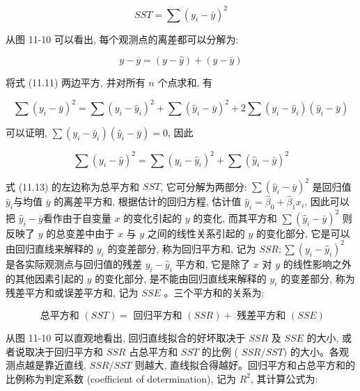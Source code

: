 \documentclass[10pt]{article}
\begin{document}
\begin{CJK*}{UTF8}{bsmi}
\begin{equation*}
S S T=\sum\left(y_{i}-\bar{y}\right)^{2} \tag{11.10}
\end{equation*}


从图 11-10 可以看出, 每个观测点的离差都可以分解为:


\begin{equation*}
y-\bar{y}=(y-\hat{y})+(\hat{y}-\bar{y}) \tag{11.11}
\end{equation*}


将式 (11.11) 两边平方, 并对所有 $n$ 个点求和, 有


\begin{equation*}
\sum\left(y_{i}-\bar{y}\right)^{2}=\sum\left(y_{i}-\hat{y}_{i}\right)^{2}+\sum\left(\hat{y}_{i}-\bar{y}\right)^{2}+2 \sum\left(y_{i}-\hat{y}_{i}\right)\left(\hat{y}_{i}-\bar{y}\right) \tag{11.12}
\end{equation*}


可以证明, $\sum\left(y_{i}-\hat{y}_{i}\right)\left(\hat{y}_{i}-\bar{y}\right)=0$, 因此


\begin{equation*}
\sum\left(y_{i}-\bar{y}\right)^{2}=\sum\left(y_{i}-\hat{y}_{i}\right)^{2}+\sum\left(\hat{y}_{i}-\bar{y}\right)^{2} \tag{11.13}
\end{equation*}


式 (11.13) 的左边称为总平方和 $S S T$, 它可分解为两部分: $\sum\left(\hat{y}_{i}-\bar{y}\right)^{2}$ 是回归值 $\hat{y}_{i}$与均值 $\bar{y}$ 的离差平方和, 根据估计的回归方程, 估计值 $\hat{y}_{i}=\hat{\beta}_{0}+\hat{\beta}_{1} x_{i}$, 因此可以把 $\hat{y}_{i}-\bar{y}$看作由于自变量 $x$ 的变化引起的 $y$ 的变化, 而其平方和 $\sum\left(\hat{y}_{i}-\bar{y}\right)^{2}$ 则反映了 $y$ 的总变差中由于 $x$ 与 $y$ 之间的线性关系引起的 $y$ 的变化部分, 它是可以由回归直线来解释的 $y_{i}$ 的变差部分, 称为回归平方和, 记为 $S S R ; \sum\left(y_{i}-\hat{y}_{i}\right)^{2}$ 是各实际观测点与回归值的残差 $y_{i}-\hat{y}_{i}$ 平方和, 它是除了 $x$ 对 $y$ 的线性影响之外的其他因素引起的 $y$ 的变化部分, 是不能由回归直线来解释的 $y_{i}$ 的变差部分, 称为残差平方和或误差平方和, 记为 $S S E$ 。三个平方和的关系为:


\begin{equation*}
\text { 总平方和 }(S S T)=\text { 回归平方和 }(S S R)+\text { 残差平方和 }(S S E) \tag{11.14}
\end{equation*}


从图 11-10 可以直观地看出, 回归直线拟合的好坏取决于 $S S R$ 及 $S S E$ 的大小, 或者说取决于回归平方和 $S S R$ 占总平方和 $S S T$ 的比例 ( $S S R / S S T)$ 的大小。各观测点越是靠近直线, $S S R / S S T$ 则越大, 直线拟合得越好。回归平方和占总平方和的比例称为判定系数 (coefficient of determination), 记为 $R^{2}$, 其计算公式为:



\end{CJK*}
\end{document}
